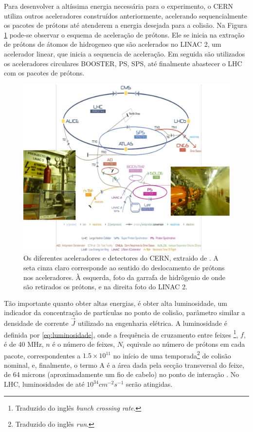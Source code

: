 Para desenvolver a altíssima energia necessária para o experimento, o CERN 
utiliza outros aceleradores construídos anteriormente, acelerando
sequencialmente os pacotes de prótons até atenderem
a energia desejada para a colisão. Na Figura \ref{fig:esquema_aceleradores} pode-se observar
o esquema de aceleração de prótons. Ele se inicia na extração de prótons de átomos
de hidrogeneo que são acelerados no LINAC 2, um acelerador linear,
que inicia a sequencia de aceleração. Em seguida são utilizados os aceleradores
circulares BOOSTER, PS, SPS, até finalmente abastecer o LHC com os pacotes de
prótons.

\begin{figure}[h!t]
\centering
\includegraphics[width=\textwidth]{imagens/lhc_garrafa_linac2.pdf}
\caption{Os diferentes aceleradores e detectores do CERN, extraido de
\cite{cern_accelerators}. A seta cinza claro corresponde ao sentido do
deslocamento de prótons nos aceleradores. À esquerda, foto da garrafa
de hidrôgenio de onde são retirados os prótons, e na direita foto do LINAC 2.}
\label{fig:esquema_aceleradores}
\end{figure}

Tão importante quanto obter altas energias, é obter alta
luminosidade, um indicador da concentração 
de partículas no ponto de colisão, parâmetro similar a densidade de 
corrente $\vec{J}$ utilizado na engenharia elétrica. A luminosidade é definida por
\ref{eq:luminosidade}, onde a frequência de cruzamento entre feixes
\footnote{Traduzido do inglês \emph{bunch crossing rate}.}, $f$, é de 40 MHz, $n$ é o número de feixes, 
$N_i$ equivale ao número de prótons em
cada pacote, correspondentes a $1.5\times10^{11}$ no início de uma
temporada\footnote{Traduzido do inglês \emph{run}.} de colisão nominal, e,
finalmente, o termo A é a área dada pela secção transversal do feixe, 
de 64 microns (aproximadamente um fio de cabelo) no ponto de interação
\cite{webLHC}. No LHC, luminosidades de até $10^{34}cm^{-2}s^{-1}$ serão
atingidas.

